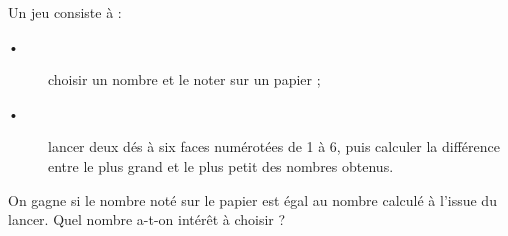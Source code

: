 
Un jeu consiste à :
\begin{description}
\item[•] choisir un nombre et le noter sur un papier ;
\item[•] lancer deux dés à six faces numérotées de 1 à 6, puis calculer la différence entre le plus grand et le plus petit des nombres obtenus.
\end{description}
 
On gagne si le nombre noté sur le papier est égal au nombre calculé à l’issue du lancer. Quel nombre a-t-on intérêt à choisir ?